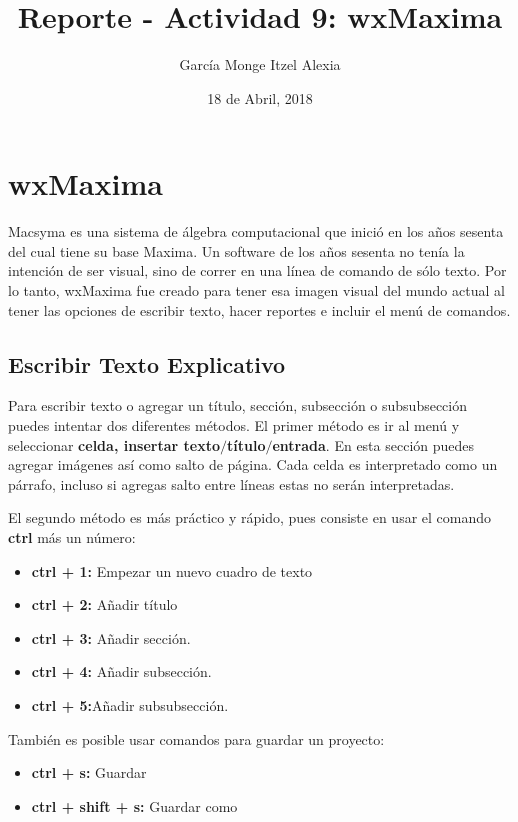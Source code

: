 \documentclass{article}
\title{Reporte - Actividad 9: wxMaxima}
\author{García Monge Itzel Alexia}
\date{18 de Abril, 2018}
\begin{document}
\maketitle
\section{wxMaxima}
Macsyma es una sistema de álgebra computacional que inició en los años sesenta del cual tiene su base Maxima. Un software de los años sesenta no tenía la intención de ser visual, sino de correr en una línea de comando de sólo texto. Por lo tanto, wxMaxima fue creado para tener esa imagen visual del mundo actual al tener las opciones de escribir texto, hacer reportes e incluir el menú de comandos.

\subsection{Escribir Texto Explicativo}
Para escribir texto o agregar un título, sección, subsección o subsubsección puedes intentar dos diferentes métodos. El primer método  es ir al menú y seleccionar \textbf{ celda, insertar texto$/$título$/$entrada}. En esta sección puedes agregar imágenes así como salto de página. Cada celda es interpretado como un párrafo, incluso si agregas salto entre líneas estas no serán interpretadas.

El segundo método es más práctico y rápido, pues consiste en usar el comando \textbf{ctrl} más un número:
\begin{itemize}
\item \textbf{ctrl + 1:} Empezar un nuevo cuadro de texto

\item \textbf{ctrl + 2:} Añadir título

\item \textbf{ctrl + 3:} Añadir sección.

\item \textbf{ctrl + 4:} Añadir subsección.

\item \textbf{ctrl + 5:}Añadir subsubsección.
\end{itemize}

También es posible usar comandos para guardar un proyecto:
\begin{itemize}
\item \textbf{ctrl + s:} Guardar

\item \textbf{ctrl + shift + s:} Guardar como
\end{itemize}
\end{document}
